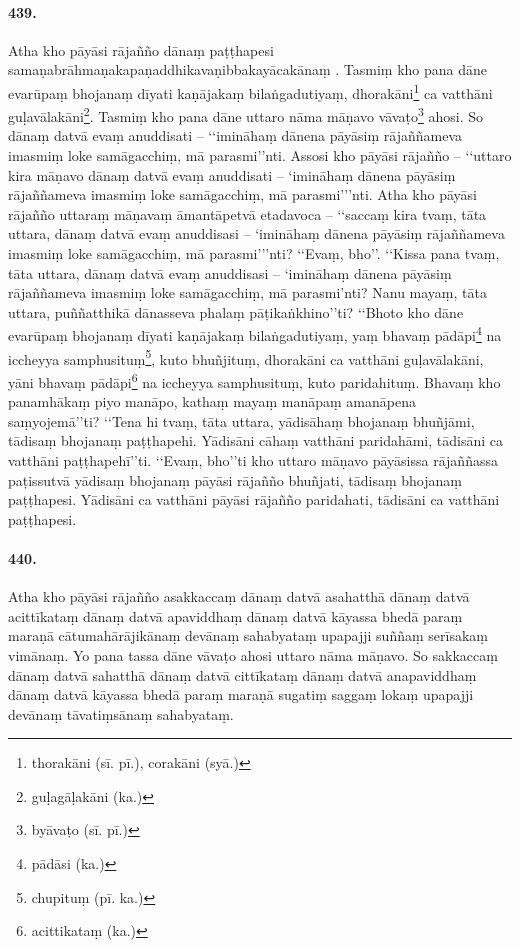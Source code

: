 \paragraph{439.} Atha kho pāyāsi rājañño dānaṃ paṭṭhapesi samaṇabrāhmaṇakapaṇaddhikavaṇibbakayācakānaṃ . Tasmiṃ kho pana dāne evarūpaṃ bhojanaṃ dīyati kaṇājakaṃ bilaṅgadutiyaṃ, dhorakāni\footnote{thorakāni (sī. pī.), corakāni (syā.)} ca vatthāni guḷavālakāni\footnote{guḷagāḷakāni (ka.)}. Tasmiṃ kho pana dāne uttaro nāma māṇavo vāvaṭo\footnote{byāvaṭo (sī. pī.)} ahosi. So dānaṃ datvā evaṃ anuddisati – ‘‘imināhaṃ dānena pāyāsiṃ rājaññameva imasmiṃ loke samāgacchiṃ, mā parasmi’’nti. Assosi kho pāyāsi rājañño – ‘‘uttaro kira māṇavo dānaṃ datvā evaṃ anuddisati – ‘imināhaṃ dānena pāyāsiṃ rājaññameva imasmiṃ loke samāgacchiṃ, mā parasmi’’’nti. Atha kho pāyāsi rājañño uttaraṃ māṇavaṃ āmantāpetvā etadavoca – ‘‘saccaṃ kira tvaṃ, tāta uttara, dānaṃ datvā evaṃ anuddisasi – ‘imināhaṃ dānena pāyāsiṃ rājaññameva imasmiṃ loke samāgacchiṃ, mā parasmi’’’nti? ‘‘Evaṃ, bho’’. ‘‘Kissa pana tvaṃ, tāta uttara, dānaṃ datvā evaṃ anuddisasi – ‘imināhaṃ dānena pāyāsiṃ rājaññameva imasmiṃ loke samāgacchiṃ, mā parasmi’nti? Nanu mayaṃ, tāta uttara, puññatthikā dānasseva phalaṃ pāṭikaṅkhino’’ti? ‘‘Bhoto kho dāne evarūpaṃ bhojanaṃ dīyati kaṇājakaṃ bilaṅgadutiyaṃ, yaṃ bhavaṃ pādāpi\footnote{pādāsi (ka.)} na iccheyya samphusituṃ\footnote{chupituṃ (pī. ka.)}, kuto bhuñjituṃ, dhorakāni ca vatthāni guḷavālakāni, yāni bhavaṃ pādāpi\footnote{acittikataṃ (ka.)} na iccheyya samphusituṃ, kuto paridahituṃ. Bhavaṃ kho panamhākaṃ piyo manāpo, kathaṃ mayaṃ manāpaṃ amanāpena saṃyojemā’’ti? ‘‘Tena hi tvaṃ, tāta uttara, yādisāhaṃ bhojanaṃ bhuñjāmi, tādisaṃ bhojanaṃ paṭṭhapehi. Yādisāni cāhaṃ vatthāni paridahāmi, tādisāni ca vatthāni paṭṭhapehī’’ti. ‘‘Evaṃ, bho’’ti kho uttaro māṇavo pāyāsissa rājaññassa paṭissutvā yādisaṃ bhojanaṃ pāyāsi rājañño bhuñjati, tādisaṃ bhojanaṃ paṭṭhapesi. Yādisāni ca vatthāni pāyāsi rājañño paridahati, tādisāni ca vatthāni paṭṭhapesi.

\paragraph{440.} Atha kho pāyāsi rājañño asakkaccaṃ dānaṃ datvā asahatthā dānaṃ datvā acittīkataṃ dānaṃ datvā apaviddhaṃ dānaṃ datvā kāyassa bhedā paraṃ maraṇā cātumahārājikānaṃ devānaṃ sahabyataṃ upapajji suññaṃ serīsakaṃ vimānaṃ. Yo pana tassa dāne vāvaṭo ahosi uttaro nāma māṇavo. So sakkaccaṃ dānaṃ datvā sahatthā dānaṃ datvā cittīkataṃ dānaṃ datvā anapaviddhaṃ dānaṃ datvā kāyassa bhedā paraṃ maraṇā sugatiṃ saggaṃ lokaṃ upapajji devānaṃ tāvatiṃsānaṃ sahabyataṃ.

